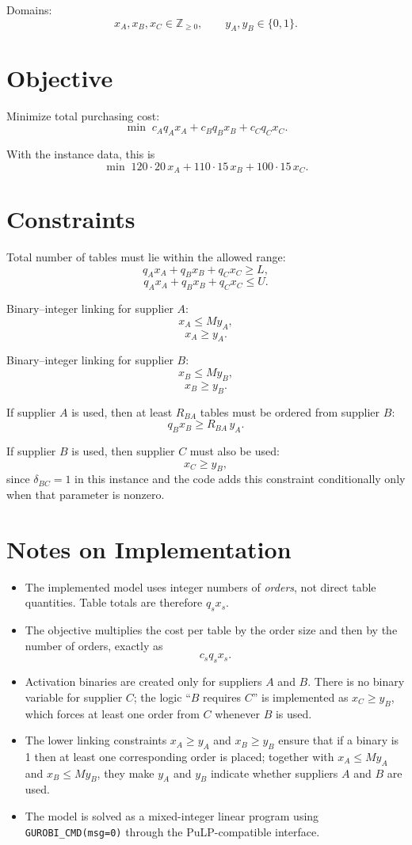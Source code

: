 Domains:
\[
x_A,x_B,x_C \in \mathbb{Z}_{\ge 0},\qquad y_A,y_B\in\{0,1\}.
\]

\section*{Objective}

Minimize total purchasing cost:
\[
\min \; c_A q_A x_A + c_B q_B x_B + c_C q_C x_C.
\]

With the instance data, this is
\[
\min \; 120\cdot 20\,x_A + 110\cdot 15\,x_B + 100\cdot 15\,x_C.
\]

\section*{Constraints}

Total number of tables must lie within the allowed range:
\[
q_A x_A + q_B x_B + q_C x_C \ge L,
\]
\[
q_A x_A + q_B x_B + q_C x_C \le U.
\]

Binary--integer linking for supplier \(A\):
\[
x_A \le M y_A,
\]
\[
x_A \ge y_A.
\]

Binary--integer linking for supplier \(B\):
\[
x_B \le M y_B,
\]
\[
x_B \ge y_B.
\]

If supplier \(A\) is used, then at least \(R_{BA}\) tables must be ordered from supplier \(B\):
\[
q_B x_B \ge R_{BA}\, y_A.
\]

If supplier \(B\) is used, then supplier \(C\) must also be used:
\[
x_C \ge y_B,
\]
since \(\delta_{BC}=1\) in this instance and the code adds this constraint conditionally only when that parameter is nonzero.

\section*{Notes on Implementation}

\begin{itemize}
    \item The implemented model uses integer numbers of \emph{orders}, not direct table quantities. Table totals are therefore \(q_s x_s\).
    \item The objective multiplies the cost per table by the order size and then by the number of orders, exactly as
    \[
    c_s q_s x_s.
    \]
    \item Activation binaries are created only for suppliers \(A\) and \(B\). There is no binary variable for supplier \(C\); the logic ``\(B\) requires \(C\)'' is implemented as \(x_C \ge y_B\), which forces at least one order from \(C\) whenever \(B\) is used.
    \item The lower linking constraints \(x_A \ge y_A\) and \(x_B \ge y_B\) ensure that if a binary is 1 then at least one corresponding order is placed; together with \(x_A \le M y_A\) and \(x_B \le M y_B\), they make \(y_A\) and \(y_B\) indicate whether suppliers \(A\) and \(B\) are used.
    \item The model is solved as a mixed-integer linear program using \texttt{GUROBI\_CMD(msg=0)} through the PuLP-compatible interface.
\end{itemize}
